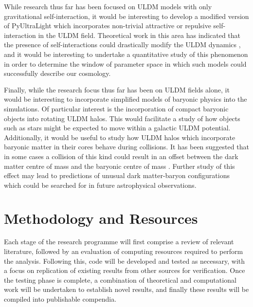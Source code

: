 While research thus far has been focused on ULDM models with only gravitational self-interaction, it would be interesting to develop a modified version of PyUltraLight which incorporates non-trivial attractive or repulsive self-interaction in the ULDM field. Theoretical work in this area has indicated that the presence of self-interactions could drastically modify the ULDM dynamics \cite{Suarez:2011yf}, and it would be interesting to undertake a quantitative study of this phenomenon in order to determine the window of parameter space in which such models could successfully describe our cosmology.

Finally, while the research focus thus far has been on ULDM fields alone, it would be interesting to incorporate simplified models of baryonic physics into the simulations. Of particular interest is the incorporation of compact baryonic objects into rotating ULDM halos. This would facilitate a study of how objects such as stars might be expected to move within a galactic ULDM potential. Additionally, it would be useful to study how ULDM halos which incorporate baryonic matter in their cores behave during collisions. It has been suggested that in some cases a collision of this kind could result in an offset between the dark matter centre of mass and the baryonic centre of mass \cite{Paredes:2015wga}. Further study of this effect may lead to predictions of unusual dark matter-baryon configurations which could be searched for in future astrophysical observations.



\section{Methodology and Resources}

Each stage of the research programme will first comprise a review of relevant literature, followed by an evaluation of computing resources required to perform the analysis. Following this, code will be developed and tested as necessary, with a focus on replication of existing results from other sources for verification. Once the testing phase is complete, a combination of theoretical and computational work will be undertaken to establish novel results, and finally these results will be compiled into publishable compendia.

